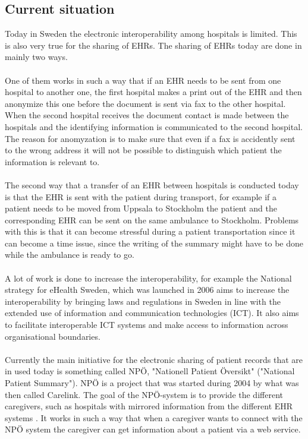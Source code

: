 \documentclass[14pt]{article}
\begin{document}
\subsection{Current situation} %
Today in Sweden the electronic \gls{interoperability} among hospitals is limited. This is also very true for the sharing of \glspl{EHR}. The sharing of \glspl{EHR} today are done in mainly two ways.
\\\\
One of them works in such a way that if an \gls{EHR} needs to be sent from one hospital to another one, the first hospital makes a print out of the \gls{EHR} and then anonymize this one before the document is sent via fax to the other hospital. When the second hospital receives the document contact is made between the hospitals and the identifying information is communicated to the second hospital.\cite{EPJ2} The reason for anomyzation is to make sure that even if a fax is accidently sent to the wrong address it will not be possible to distinguish which patient the information is relevant to.
\\\\
The second way that a transfer of an \gls{EHR} between hospitals is conducted today is that the \gls{EHR} is sent with the patient during transport, for example if a patient needs to be moved from Uppsala to Stockholm the patient and the corresponding \gls{EHR} can be sent on the same ambulance to Stockholm\cite{EPJ2}. Problems with this is that it can become stressful during a patient transportation since it can become a time issue, since the writing of the summary might have to be done while the ambulance is ready to go\cite{EPJ2}.
\\\\
A lot of work is done to increase the \gls{interoperability}, for example the National strategy for eHealth Sweden, which was launched in 2006 aims to increase the interoperability by bringing laws and regulations in Sweden in line with the extended use of information and communication technologies (ICT). It also aims to facilitate interoperable ICT systems and make access to information across organisational boundaries\cite{NationalStrategy}. 
\\\\
Currently the main initiative for the electronic sharing of patient records that are in used today is something called NPÖ, "Nationell Patient Översikt" ("National Patient Summary"). NPÖ is a project that was started during 2004 by what was then called Carelink\cite{ViktorJernelov}. The goal of the NPÖ-system is to provide the different caregivers, such as hospitals with mirrored information from the different \gls{EHR} systems \cite{ViktorJernelov}. It works in such a way that when a caregiver wants to connect with the NPÖ system the caregiver can get information about a patient via a web service. 
\end{document}
